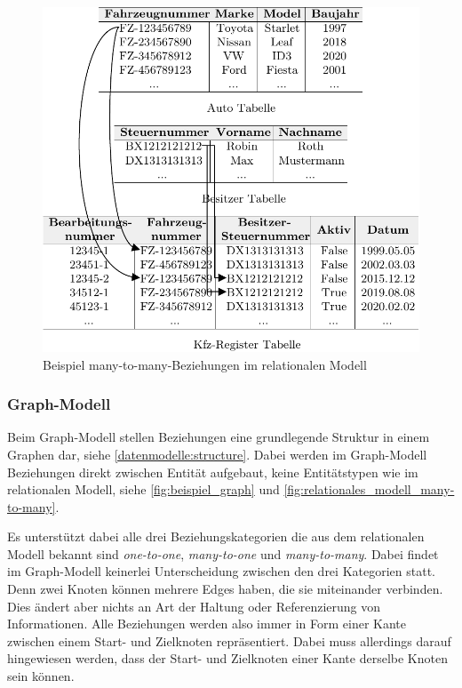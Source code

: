 \begin{figure}[h]
    \centering
    \includegraphics[width=\textwidth]{images/many-to-many.pdf}
    \caption{Beispiel many-to-many-Beziehungen im relationalen Modell}
    \label{fig:relationales_modell_many-to-many}
\end{figure}

\subsubsection{Graph-Modell}
Beim Graph-Modell stellen Beziehungen eine grundlegende Struktur in einem Graphen dar, siehe \autoref{datenmodelle:structure}. Dabei werden im Graph-Modell Beziehungen direkt zwischen Entität aufgebaut, keine Entitätstypen wie im relationalen Modell, siehe \autoref{fig:beispiel_graph} und \autoref{fig:relationales_modell_many-to-many}.

Es unterstützt dabei alle drei Beziehungskategorien die aus dem relationalen Modell bekannt sind \textit{one-to-one}, \textit{many-to-one} und \textit{many-to-many}. Dabei findet im Graph-Modell keinerlei Unterscheidung zwischen den drei Kategorien statt. Denn zwei Knoten können mehrere Edges haben, die sie miteinander verbinden. Dies ändert aber nichts an Art der Haltung oder Referenzierung von Informationen. Alle Beziehungen werden also immer in Form einer Kante zwischen einem Start- und Zielknoten repräsentiert. Dabei muss allerdings darauf hingewiesen werden, dass der Start- und Zielknoten einer Kante derselbe Knoten sein können.

